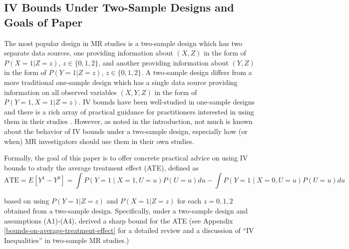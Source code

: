 \documentclass[
]{article}
\theoremstyle{plain}
\begin{document}
\hypertarget{iv-bounds-under-two-sample-designs-and-goals-of-paper}{%
\subsection{IV Bounds Under Two-Sample Designs and Goals of Paper}\label{iv-bounds-under-two-sample-designs-and-goals-of-paper}}

\label{review-study-designs-and-target-estimand}

The most popular design in MR studies is a two-sample design which has two separate data sources, one providing information about \((X,Z)\) in the form of \(P(X = 1 | Z = z)\), \(z \in \{0, 1, 2\}\), and another providing information about \((Y,Z)\) in the form of \(P(Y = 1 | Z = z)\), \(z \in \{0, 1, 2\}\). A two-sample design differs from a more traditional one-sample design which has a single data source providing information on all observed variables \((X,Y,Z)\) in the form of \(P(Y = 1, X=1 | Z = z)\). IV bounds have been well-studied in one-sample designs and there is a rich array of practical guidance for practitioners interested in using them in their studies \autocite{balke_bounds_1997,richardson_ace_2014,swanson_partial_2018}. However, as noted in the introduction, not much is known about the behavior of IV bounds under a two-sample design, especially how (or when) MR investigators should use them in their own studies.

Formally, the goal of this paper is to offer concrete practical advice on using IV bounds to study the average treatment effect (ATE), defined as
\[
\text{ATE} = E[Y^1 - Y^0] = \int P(Y=1 \mid X = 1, U=u) P(U=u) du - \int P(Y=1 \mid X = 0, U=u) P(U=u) du
\]

based on using \(P(Y = 1 | Z = z)\) and \(P(X = 1 | Z = z)\) for each \(z=0,1,2\) obtained from a two-sample design. Specifically, under a two-sample design and assumptions (A1)-(A4), \textcite{ramsahai_causal_2012} derived a sharp bound for the ATE (see Appendix \ref{bounds-on-average-treatment-effect} for a detailed review and a discussion of ``IV Inequalities'' \autocite{balke_bounds_1997,diemer_application_2020} in two-sample MR studies.)
\end{document}

